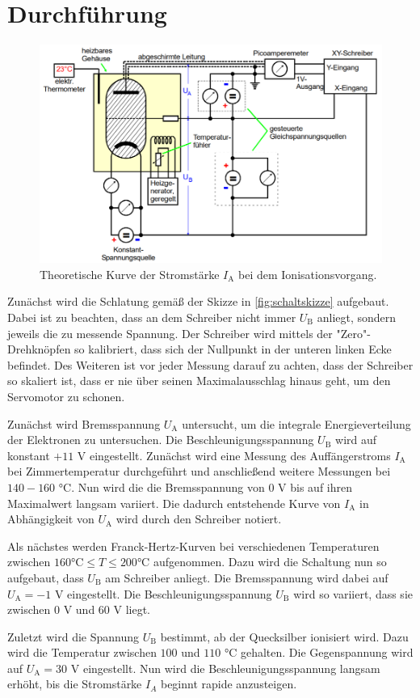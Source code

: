 \section{Durchführung}
\label{sec:Durchführung}

\begin{figure}
    \centering
    \includegraphics[width=\textwidth]{content/schaltskizze.PNG}
    \caption{Theoretische Kurve der Stromstärke $I_\text{A}$ bei dem Ionisationsvorgang\cite{V601}.}
    \label{fig:schaltskizze}
\end{figure}

Zunächst wird die Schlatung gemäß der Skizze in \autoref{fig:schaltskizze} aufgebaut. Dabei ist zu beachten, dass an dem Schreiber nicht immer $U_\text{B}$ anliegt, sondern jeweils die zu messende Spannung.
Der Schreiber wird mittels der "Zero"-Drehknöpfen so kalibriert, dass sich der Nullpunkt in der unteren linken Ecke befindet. Des Weiteren ist vor jeder Messung darauf zu achten, dass der Schreiber so skaliert ist, dass er nie über seinen Maximalausschlag hinaus geht, um den Servomotor zu schonen.

Zunächst wird Bremsspannung $U_\text{A}$ untersucht, um die integrale Energieverteilung der Elektronen zu untersuchen.
Die Beschleunigungsspannung $U_\text{B}$ wird auf konstant $+11$ V eingestellt. Zunächst wird eine Messung des Auffängerstroms $I_\text{A}$ bei Zimmertemperatur durchgeführt und anschließend weitere Messungen bei $140 - 160$ °C.
Nun wird die die Bremsspannung von 0 V bis auf ihren Maximalwert langsam variiert. Die dadurch entstehende Kurve von $I_\text{A}$ in Abhängigkeit von $U_\text{A}$ wird durch den Schreiber notiert.

Als nächstes werden Franck-Hertz-Kurven bei verschiedenen Temperaturen zwischen $160 \text{°C} \leq T \leq 200 \text{°C}$ aufgenommen. Dazu wird die Schaltung nun so aufgebaut, dass $U_\text{B}$ am Schreiber anliegt.
Die Bremsspannung wird dabei auf $U_\text{A} = -1$ V eingestellt. Die Beschleunigungsspannung $U_\text{B}$ wird so variiert, dass sie zwischen 0 V und 60 V liegt.

Zuletzt wird die Spannung $U_\text{B}$ bestimmt, ab der Quecksilber ionisiert wird. Dazu wird die Temperatur zwischen $100$ und $110$ °C gehalten. Die Gegenspannung wird auf $U_\text{A} = 30$ V eingestellt.
Nun wird die Beschleunigungsspannung langsam erhöht, bis die Stromstärke $I_A$ beginnt rapide anzusteigen.